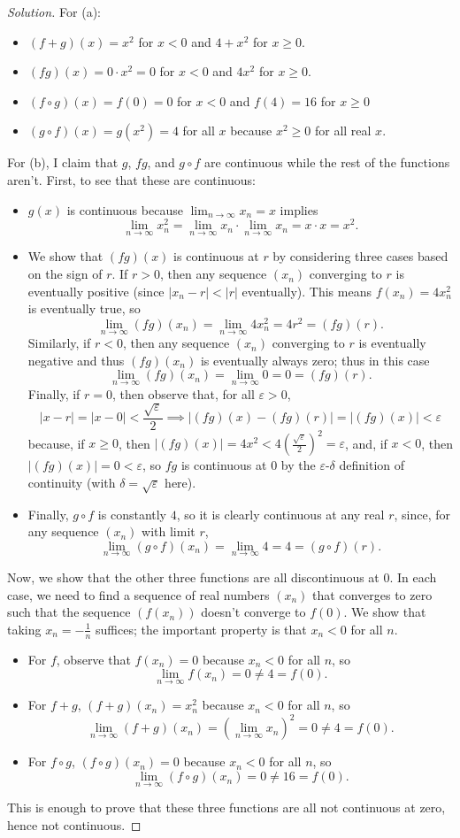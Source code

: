 \documentclass[11pt]{scrartcl}
\providecommand{\eps}{\varepsilon}
\providecommand{\ii}{\item}
\theoremstyle{problem}
\theoremstyle{remark}
\newenvironment{soln}{\begin{proof}[Solution]}{\end{proof}}
\begin{document}
\begin{soln}
	For (a):
	\begin{itemize}
		\ii $(f + g)(x) = x^2$ for $x < 0$ and $4 + x^2$ for $x \ge 0$.
		\ii $(fg)(x) = 0\cdot x^2 = 0$ for $x < 0$ and $4x^2$ for $x\ge 0$.
		\ii $(f\circ g)(x) = f(0) = 0$ for $x < 0$ and $f(4) = 16$ for $x\ge 0$
		\ii $(g\circ f)(x) = g(x^2) = 4$ for all $x$ because
		$x^2 \ge 0$ for all real $x$.
	\end{itemize}
	
	For (b), I claim that $g$, $fg$, and $g\circ f$ are continuous
	while the rest of the functions aren't.
	First, to see that these are continuous:
	\begin{itemize}
		\ii $g(x)$ is continuous because $\lim_{n\to\infty} x_n = x$ implies
		\[\lim_{n\to\infty} x_n^2 =
		\lim_{n\to\infty} x_n \cdot \lim_{n\to\infty} x_n = x\cdot x = x^2.\]
		\ii We show that $(fg)(x)$ is continuous at $r$
		by considering three cases based on the sign of $r$.
		If $r > 0$, then any sequence $(x_n)$ converging to $r$ is eventually
		positive (since $|x_n - r| < |r|$ eventually).
		This means $f(x_n) = 4x_n^2$ is eventually true, so
		\[\lim_{n\to\infty} (fg)(x_n) = \lim_{n\to\infty} 4x_n^2 = 4r^2
		= (fg)(r).\]
		Similarly, if $r < 0$, then any sequence $(x_n)$ converging to $r$
		is eventually negative and thus $(fg)(x_n)$ is eventually always zero;
		thus in this case
		\[\lim_{n\to\infty} (fg)(x_n) = \lim_{n\to\infty} 0 = 0 = (fg)(r).\]
		Finally, if $r = 0$, then observe that, for all $\eps > 0$,
		\[|x - r| = |x - 0| < \frac{\sqrt\eps}{2} \implies
		|(fg)(x) - (fg)(r)| = |(fg)(x)| < \eps\]
		because, if $x \ge 0$, then $|(fg)(x)| = 4x^2
		< 4(\frac{\sqrt\eps}{2})^2 = \eps$,
		and, if $x < 0$, then $|(fg)(x)| = 0 < \eps$,
		so $fg$ is continuous at $0$ by the $\eps$-$\delta$ definition
		of continuity (with $\delta = \sqrt\eps$ here).
		\ii Finally, $g\circ f$ is constantly $4$, so it is clearly continuous
		at any real $r$, since, for any sequence $(x_n)$ with limit $r$,
		\[\lim_{n\to\infty} (g\circ f)(x_n) = \lim_{n\to\infty} 4 =
		4 = (g\circ f)(r).\]
	\end{itemize}
	
	Now, we show that the other three functions are all discontinuous at $0$.
	In each case, we need to find a sequence of real numbers $(x_n)$
	that converges to zero such that
	the sequence $(f(x_n))$ doesn't converge to $f(0)$.
	We show that taking $x_n = -\frac1n$ suffices;
	the important property is that $x_n < 0$ for all $n$.
	\begin{itemize}
		\ii For $f$, observe that $f(x_n) = 0$ because $x_n < 0$ for all $n$, so
		\[\lim_{n\to\infty} f(x_n) = 0 \ne 4 = f(0).\]
		\ii For $f+g$, $(f+g)(x_n) = x_n^2$ because $x_n < 0$ for all $n$, so
		\[\lim_{n\to\infty} (f+g)(x_n) = (\lim_{n\to\infty} x_n)^2 = 0
		\ne 4 = f(0).\]
		\ii For $f\circ g$, $(f\circ g)(x_n) = 0$ because $x_n < 0$ for all $n$,
		so
		\[\lim_{n\to\infty}(f\circ g)(x_n) = 0 \ne 16 = f(0).\]
	\end{itemize}
	This is enough to prove that these three functions are all
	not continuous at zero, hence not continuous.
\end{soln}
\end{document}
